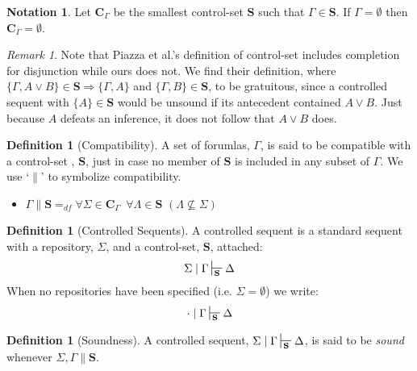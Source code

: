 \documentclass{article}                     %
\theoremstyle{theorem}
\theoremstyle{corollary}
\theoremstyle{lemma}
\theoremstyle{definition}
\newtheorem{definition}[section]{Definition}
\theoremstyle{remark}
\newtheorem{remark}{Remark}
\theoremstyle{definition}
\theoremstyle{notation}
\newtheorem{notation}{Notation}
\theoremstyle{definition}
\theoremstyle{proposition}
\theoremstyle{definition}
\begin{document}
\begin{notation}
	Let $ \mathbf{C}_{\Gamma} $ be the smallest control-set $ \mathbf{S} $ such that $ \Gamma \in \mathbf{S} $. If $ \Gamma = \emptyset $ then $ \mathbf{C}_{\Gamma} = \emptyset $.
\end{notation}


\begin{remark}
Note that Piazza et al.'s definition of control-set includes completion for disjunction while ours does not. We find their definition, where $\{\Gamma, A \vee B\} \in \mathbf{S} \Rightarrow \{\Gamma, A\}$ and $\{\Gamma, B\} \in \mathbf{S}  $, to be gratuitous, since a controlled sequent with $ \{A\} \in \mathbf{S} $ would be unsound if its antecedent contained $ A \vee B $. Just because $ A $ defeats an inference, it does not follow that $ A\vee B $ does.
\end{remark}

\begin{definition}[Compatibility]\label{compat}
A set of forumlas, $\Gamma$, is said to be compatible with a control-set , $\mathbf{S}$, just in case no member of $\mathbf{S}$ is included in any subset of $\Gamma$. We use `$\parallel$' to symbolize compatibility.
\begin{itemize}
\item $\Gamma\parallel\mathbf{S} =_{df} \forall \Sigma \in \mathbf{C}_{\Gamma}\,\,\, \forall \Lambda \in \mathbf{S}\,\,(\Lambda \not\subseteq \Sigma) $
\end{itemize}
\end{definition}

\begin{definition}[Controlled Sequents]
	A controlled sequent is a standard sequent with  a repository, $ \Sigma $, and a control-set, $ \mathbf{S} $, attached:
	$$ \Sigma\mid\Gamma\sststile{\mathbf{S}}{}\Delta $$
	When no repositories have been specified (i.e. $\Sigma = \emptyset$) we write:
	$$ \cdot\mid\Gamma\sststile{\mathbf{S}}{}\Delta$$
\end{definition}

\begin{definition}[Soundness]
	A controlled sequent, $ \Sigma\mid\Gamma \sststile{\mathbf{S}}{} \Delta $, is said to be \textit{sound} whenever $ \Sigma,\Gamma\parallel\mathbf{S} $.
	
\end{definition}
\end{document}
